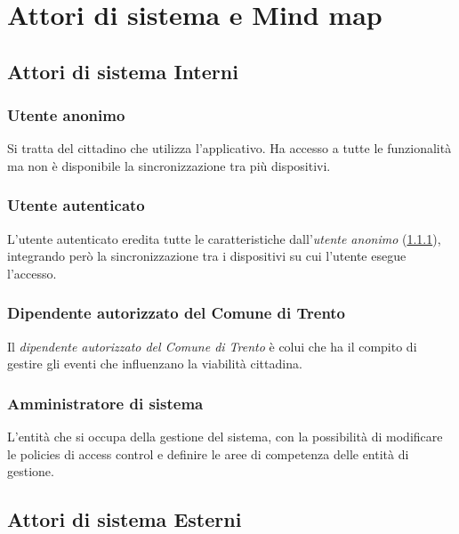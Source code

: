 \documentclass{article}
\begin{document}
\section{Attori di sistema e Mind map}

\subsection{Attori di sistema Interni}

\subsubsection{Utente anonimo}\label{Attori_UtenteAnonimo}
Si tratta del cittadino che utilizza l'applicativo. Ha accesso a tutte le funzionalità ma non è disponibile la sincronizzazione tra più dispositivi.

\subsubsection{Utente autenticato}
L'utente autenticato eredita tutte le caratteristiche dall'\textit{utente anonimo} (\ref{Attori_UtenteAnonimo}), integrando però la sincronizzazione tra i dispositivi su cui l'utente esegue l'accesso.

\subsubsection{Dipendente autorizzato del Comune di Trento}\label{Attori_DipendenteAutorizzato}
Il \textit{dipendente autorizzato del Comune di Trento} è colui che ha il compito di gestire gli eventi che influenzano la viabilità cittadina.

\subsubsection{Amministratore di sistema}
L'entità che si occupa della gestione del sistema, con la possibilità di modificare le policies di access control e definire le aree di competenza delle entità di gestione.

\subsection{Attori di sistema Esterni}
\end{document}
